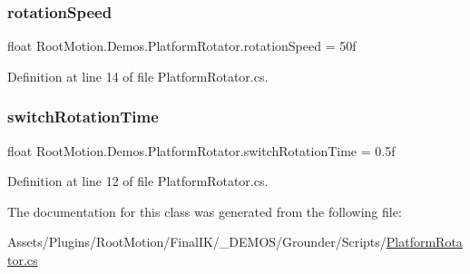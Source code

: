 \subsubsection{\texorpdfstring{rotation\+Speed}{rotationSpeed}}
{\footnotesize\ttfamily float Root\+Motion.\+Demos.\+Platform\+Rotator.\+rotation\+Speed = 50f}



Definition at line 14 of file Platform\+Rotator.\+cs.

\mbox{\label{class_root_motion_1_1_demos_1_1_platform_rotator_af5bf588dcf51d5f4e50c8de1c341e165}} 
\subsubsection{\texorpdfstring{switch\+Rotation\+Time}{switchRotationTime}}
{\footnotesize\ttfamily float Root\+Motion.\+Demos.\+Platform\+Rotator.\+switch\+Rotation\+Time = 0.\+5f}



Definition at line 12 of file Platform\+Rotator.\+cs.



The documentation for this class was generated from the following file\+:\begin{DoxyCompactItemize}
\item 
Assets/\+Plugins/\+Root\+Motion/\+Final\+I\+K/\+\_\+\+D\+E\+M\+O\+S/\+Grounder/\+Scripts/\mbox{\hyperlink{_platform_rotator_8cs}{Platform\+Rotator.\+cs}}\end{DoxyCompactItemize}
